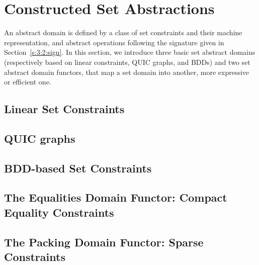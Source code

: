 \section{Constructed Set Abstractions}
\label{sec:constructed}
An abstract domain is defined by a class of set constraints and their machine
representation, and abstract operations following the signature given in
Section~\ref{s:3:2:sign}.
In this section, we introduce three basic set abstract domains (respectively
based on linear constraints, QUIC graphs, and BDDs) and two set abstract
domain functors, that map a set domain into another, more expressive or
efficient one.

\subsection{Linear Set Constraints}
\label{s:4:1:lin}

\subsection{QUIC graphs}
\label{s:4:2:quic}

\subsection{BDD-based Set Constraints}
\label{s:4:3:bdd}

\subsection{The Equalities Domain Functor: Compact Equality Constraints}
\label{s:4:4:eqs}

\subsection{The Packing Domain Functor: Sparse Constraints}
\label{s:4:5:packs}
